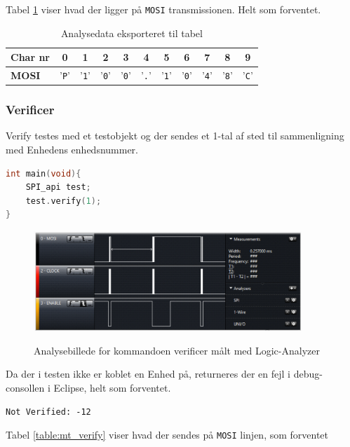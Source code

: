 Tabel \ref{table:mt_config} viser hvad der ligger på \verb+MOSI+ transmissionen. Helt som forventet.

\begin{table}[H]
	\caption{Analysedata eksporteret til tabel}
	\centering
	\begin{tabular}{|l|c|c|c|c|c|c|c|c|c|c|}
		\hline 
		\textbf{Char nr} & \textbf{0} & \textbf{1} & \textbf{2} & \textbf{3} & \textbf{4} & \textbf{5} 
						 & \textbf{6} & \textbf{7} & \textbf{8} & \textbf{9}\\ 		
		\hline 
		\textbf{MOSI} & '\verb+P+' & '\verb+1+' & '\verb+0+' & '\verb+0+' & '\verb+.+' & '\verb+1+' 
						& '\verb+0+' & '\verb+4+' & '\verb+8+' & '\verb+C+' \\ 
		\hline 
	\end{tabular} 
	\label{table:mt_config}
\end{table}


\subsubsection*{Verificer}
Verify testes med et testobjekt og der sendes et 1-tal af sted til sammenligning med Enhedens enhedsnummer.

\begin{lstlisting}[language=C]
int main(void){
	SPI_api test;	
	test.verify(1);
}
\end{lstlisting}

\begin{figure}[H]
\centering
{\includegraphics[width=0.90\textwidth]{filer/modultest/Billeder/mt_verify}}
\caption{Analysebillede for kommandoen verificer målt med Logic-Analyzer}
\label{lab:mt_verify}
\end{figure}

Da der i testen ikke er koblet en Enhed på, returneres der en fejl i debug-consollen i Eclipse, helt som forventet.

\verb+Not Verified: -12+

Tabel \ref{table:mt_verify} viser hvad der sendes på \verb+MOSI+ linjen, som forventet

